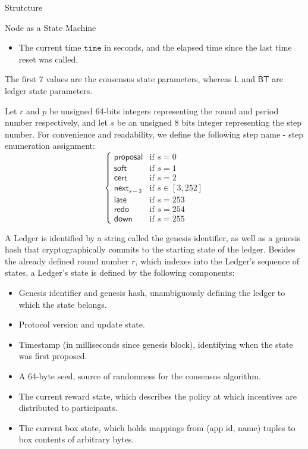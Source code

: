 \documentclass[10pt,a4paper]{article}
\begin{document}
\begin{section}{Strutcture}
\begin{subsection}{Node as a State Machine}
\begin{itemize}
    \item 
    The current time $\mathtt{time}$ in seconds, and the elapsed time since the last
    time reset was called.
\end{itemize}
The first 7 values are the {\sf consensus state parameters},
whereas $\mathsf{L}$ and $\mathsf{BT}$ are {\sf ledger state parameters}.

Let $r$ and $p$ be unsigned 64-bits integers representing the round and period number respectively, and 
let $s$  be an unsigned 8 bits integer representing the step number.
For convenience and readability, we define the following step name - step enumeration assignment:
\begin{equation}\label{table:s}
\left\{    
    \begin{array}{ll}
        \mathsf{proposal}&\mbox{if }s=0 \\
        \mathsf{soft}&\mbox{if }s=1 \\
        \mathsf{cert}&\mbox{if }s=2\\
        \mathsf{next}_{s-3}&\mbox{if }s\in [3, 252]\\
        \mathsf{late}&\mbox{if }s=253\\
        \mathsf{redo}&\mbox{if }s=254\\
        \mathsf{down}&\mbox{if }s=255
    \end{array}
\right.
\end{equation}

A Ledger is identified by a string called the genesis identifier, as well as a genesis hash that cryptographically 
commits to the starting state of the ledger.
Besides the already defined round number $r$, which indexes into the Ledger's sequence of states,
a Ledger's state is defined by the following components:
\begin{itemize}
    \item Genesis identifier and genesis hash, unambiguously defining the ledger 
    to which the state belongs.
    \item Protocol version and update state.
    \item Timestamp (in milliseconds since genesis block), identifying when the state was first proposed.
    \item A 64-byte seed, source of randomness for the consensus algorithm.
    \item The current reward state, which describes the policy at which incentives
    are distributed to participants.
    \item The current box state, which holds mappings from (app id, name) tuples
    to box contents of arbitrary bytes.
\end{itemize}


\end{subsection}
\end{section}
\end{document}
